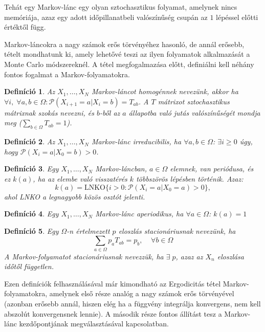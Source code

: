 \documentclass[10pt,a4paper]{article}
\numberwithin{equation}{subsection}
\numberwithin{figure}{section}
\newtheorem{definition}{Definíció}[section]
\begin{document}
Tehát egy Markov-lánc egy olyan sztochasztikus folyamat, amelynek nincs memóriája, azaz egy adott időpillanatbeli valószínűség csupán az $1$ lépéssel előtti értéktől függ. 

Markov-láncokra a nagy számok erős törvényéhez hasonló, de annál erősebb, tételt mondhatunk ki, amely lehetővé teszi az ilyen folyamatok alkalmazását a Monte Carlo módszereknél. A tétel megfogalmazása előtt, definiálni kell néhány fontos fogalmat a Markov-folyamatokra.

\begin{definition}
Az $X_1,\dots,X_N$ Markov-láncot homogénnek nevezünk, akkor ha $\forall i,\;\forall a,b\in\Omega: \mathcal{P}(X_{i+1}=a|X_{i}=b)=T_{ab}$. A $T$ mátrixot sztochasztikus mátrixnak szokás nevezni, és $b$-ből az $a$ állapotba való jutás valószínűségét mondja meg  ($\sum_{b\in\Omega}T_{ab}=1$).
\end{definition}

\begin{definition}
Az $X_1,\dots,X_N$ Markov-lánc irreducibilis, ha $\forall a,b\in\Omega$: $\exists i\geq 0$ úgy, hogy $\mathcal{P}(X_i=a|X_{0}=b)>0$.
\end{definition}

\begin{definition}
Egy $X_1,\dots,X_N$ Markov-láncban, $a\in \Omega$ elemnek, van periódusa, és ez $k(a)$, ha az elembe való visszatérés $k$ többszörös lépésben történik. Azaz:
\begin{equation}
k(a)=\mathrm{LNKO}\{i>0: \mathcal{P}(X_i=a|X_0=a)>0\},
\end{equation} 
ahol LNKO a legnagyobb közös osztót jelenti.
\end{definition}

\begin{definition}
Egy $X_1,\dots,X_N$ Markov-lánc aperiodikus, ha $\forall a\in\Omega$: $k(a)=1$
\end{definition}

\begin{definition}
Egy $\Omega$-n értelmezett $p$ eloszlás stacionáriusnak nevezünk, ha
\begin{equation}
\sum_{a\in\Omega}p_aT_{ab}=p_b,\;\;\;\;\forall b\in\Omega
\end{equation}
A Markov-folyamatot stacionáriusnak nevezzük, ha $\exists\;p$, azaz az $X_n$ eloszlása időtől független.
\end{definition}

Ezen definíciók felhasználásával már kimondható az Ergodicitás tétel Markov-folyamatokra, amelynek első része  analóg a nagy számok erős törvényével (azonban erősebb annál, hiszen elég ha a függvény integrálja konvergens, nem kell abszolút konvergensnek lennie). A második része fontos állítást tesz a Markov-lánc kezdőpontjának megválasztásával kapcsolatban.
\end{document}
